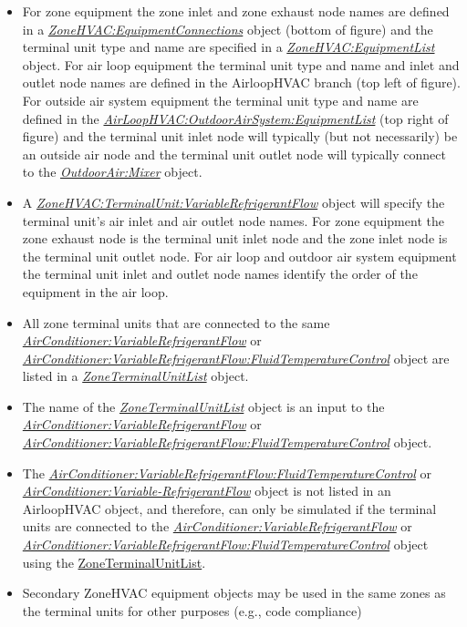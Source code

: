 \begin{itemize}
\item
 For zone equipment the zone inlet and zone exhaust node names are defined in a \emph{\hyperref[zonehvacequipmentconnections]{ZoneHVAC:EquipmentConnections}} object (bottom of figure) and the terminal unit type and name are specified in a \emph{\hyperref[zonehvacequipmentlist]{ZoneHVAC:EquipmentList}} object. For air loop equipment the terminal unit type and name and inlet and outlet node names are defined in the AirloopHVAC branch (top left of figure). For outside air system equipment the terminal unit type and name are defined in the \emph{\hyperref[airloophvacoutdoorairsystemequipmentlist]{AirLoopHVAC:OutdoorAirSystem:EquipmentList}} (top right of figure) and the terminal unit inlet node will typically (but not necessarily) be an outside air node and the terminal unit outlet node will typically connect to the \emph{\hyperref[outdoorairmixer]{OutdoorAir:Mixer}} object.
\item
  A \emph{\hyperref[zonehvacterminalunitvariablerefrigerantflow]{ZoneHVAC:TerminalUnit:VariableRefrigerantFlow}} object will specify the terminal unit's air inlet and air outlet node names. For zone equipment the zone exhaust node is the terminal unit inlet node and the zone inlet node is the terminal unit outlet node. For air loop and outdoor air system equipment the terminal unit inlet and outlet node names identify the order of the equipment in the air loop.
\item
  All zone terminal units that are connected to the same \emph{\hyperref[airconditionervariablerefrigerantflow]{AirConditioner:VariableRefrigerantFlow}} or \emph{\hyperref[airconditionervariablerefrigerantflowfluidtemperaturecontrol]{AirConditioner:VariableRefrigerantFlow:FluidTemperatureControl}} object are listed in a \emph{\hyperref[zoneterminalunitlist]{ZoneTerminalUnitList}} object.
\item
  The name of the \emph{\hyperref[zoneterminalunitlist]{ZoneTerminalUnitList}} object is an input to the \emph{\hyperref[airconditionervariablerefrigerantflow]{AirConditioner:VariableRefrigerantFlow}} or \emph{\hyperref[airconditionervariablerefrigerantflowfluidtemperaturecontrol]{AirConditioner:VariableRefrigerantFlow:FluidTemperatureControl}} object.
\item
  The \emph{\hyperref[airconditionervariablerefrigerantflowfluidtemperaturecontrol]{AirConditioner:VariableRefrigerantFlow:FluidTemperatureControl}} or \emph{\hyperref[airconditionervariablerefrigerantflow]{AirConditioner:Variable-RefrigerantFlow}} object is not listed in an AirloopHVAC object, and therefore, can only be simulated if the terminal units are connected to the \emph{\hyperref[airconditionervariablerefrigerantflow]{AirConditioner:VariableRefrigerantFlow}} or \emph{\hyperref[airconditionervariablerefrigerantflowfluidtemperaturecontrol]{AirConditioner:VariableRefrigerantFlow:FluidTemperatureControl}} object using the \hyperref[zoneterminalunitlist]{ZoneTerminalUnitList}.
\item
  Secondary ZoneHVAC equipment objects may be used in the same zones as the terminal units for other purposes (e.g., code compliance)
\end{itemize}

